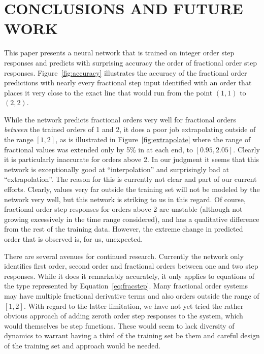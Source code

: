 \section{CONCLUSIONS AND FUTURE WORK}
\label{sec:conclusions}

This paper presents a neural network that is trained on integer order step
responses and predicts with surprising accuracy the order of fractional order
step responses. Figure~\ref{fig:accuracy} illustrates the accuracy of the
fractional order predictions with nearly every fractional step input identified
with an order that places it very close to the exact line that would run from
the point $(1,1)$ to $(2,2)$. 

While the network predicts fractional orders very well for fractional orders
\emph{between} the trained orders of 1 and 2, it does a poor job extrapolating
outside of the range $[1,2]$, as is illustrated in Figure~\ref{fig:extrapolate}
where the range of fractional values was extended only by 5\% in at each end, to
$\left[ 0.95, 2.05 \right]$. Clearly it is particularly inaccurate for orders
above 2. In our judgment it seems that this network is exceptionally good at
``interpolation'' and surprisingly bad at ``extrapolation''. The reason for this
is currently not clear and part of our current efforts. Clearly, values very far
outside the training set will not be modeled by the network very well, but this
network is striking to us in this regard.  Of course, fractional order step
responses for orders above 2 are unstable (although not growing excessively in
the time range considered), and has a qualitative difference from the rest of
the training data. However,  the extreme change in predicted order that is
observed is, for us, unexpected. 

There are several avenues for continued research. Currently the network only
identifies first order, second order and fractional orders between one and two
step responses. While it does it remarkably accurately, it only applies to
equations of the type represented by Equation~\ref{eq:fracstep}. Many fractional
order systems may have multiple fractional derivative terms and also orders
outside the range of $[1,2]$. With regard to the latter limitation, we have not
yet tried the rather obvious approach of adding zeroth order step responses to
the system, which would themselves be step functions. These would seem to lack
diversity of dynamics to warrant having a third of the training set be them and
careful design of the training set and approach would be needed. 

